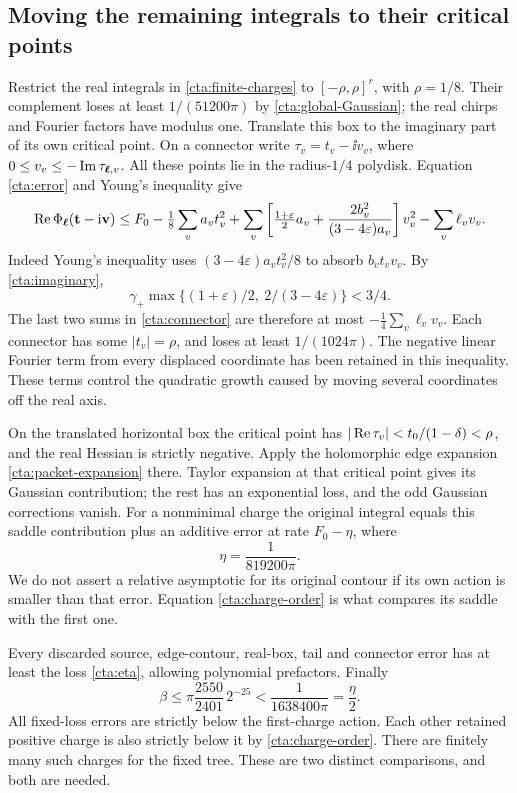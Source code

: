 \subsection{Moving the remaining integrals to their critical points}
Restrict the real integrals in \eqref{cta:finite-charges} to
\([-\rho,\rho]^r\), with \(\rho=1/8\).
Their complement loses at least \(1/(51200\pi)\) by
\eqref{cta:global-Gaussian}; the real chirps and Fourier
factors have modulus one.
Translate this box to the imaginary part of its own critical
point. On a connector write \(\tau_v=t_v-\ii v_v\), where
\(0\le v_v\le-\operatorname{Im}\tau_{\boldsymbol\ell,v}\).
All these points lie in the radius-\(1/4\) polydisk.
Equation \eqref{cta:error} and Young's inequality give
\begin{equation}\label{cta:connector}
 \begin{split}
 \operatorname{Re}\Phi_{\boldsymbol\ell}(\mathbf t-\mathrm i\mathbf v)
 \le F_0-\tfrac18\sum_va_vt_v^2
 +\sum_v\left[
  \tfrac{1+\varepsilon}{2}a_v+
       \frac{2b_v^2}{(3-4\varepsilon)a_v}\right]v_v^2
 -\sum_v\ell_vv_v .
 \end{split}
\end{equation}
Indeed Young's inequality uses
\((3-4\varepsilon)a_vt_v^2/8\) to absorb \(b_vt_vv_v\).
By \eqref{cta:imaginary},
\[
 \gamma_+\max\{(1+\varepsilon)/2,\ 2/(3-4\varepsilon)\}<3/4.
\]
The last two sums in \eqref{cta:connector} are therefore at
most \(-\tfrac14\sum_v\ell_vv_v\). Each connector has some
\(|t_v|=\rho\), and loses at least \(1/(1024\pi)\).
The negative linear Fourier term from every displaced coordinate
has been retained in this inequality. These terms control the
quadratic growth caused by moving several coordinates off the real
axis.

On the translated horizontal box the critical point has
\(|\operatorname{Re}\tau_v|<t_0/(1-\delta)<\rho\), and the real Hessian
is strictly negative. Apply the holomorphic edge expansion
\eqref{cta:packet-expansion} there. Taylor expansion at that
critical point gives its Gaussian contribution; the rest has
an exponential loss, and the odd Gaussian corrections vanish.
For a nonminimal charge the original integral equals this
saddle contribution plus an additive error at rate
\(F_0-\eta\), where
\begin{equation}\label{cta:eta}
 \eta=\frac1{819200\pi}.
\end{equation}
We do not assert a relative asymptotic for its original
contour if its own action is smaller than that error.
Equation \eqref{cta:charge-order} is what compares its saddle
with the first one.

Every discarded source, edge-contour, real-box, tail and
connector error has at least the loss \eqref{cta:eta}, allowing
polynomial prefactors. Finally
\begin{equation}\label{cta:budget}
 \beta\le\pi\frac{2550}{2401}\,2^{-25}
                      <\frac1{1638400\pi}=\frac\eta2.
\end{equation}
All fixed-loss errors are strictly below the first-charge
action. Each other retained positive charge is also strictly
below it by \eqref{cta:charge-order}. There are finitely many
such charges for the fixed tree. These are two distinct
comparisons, and both are needed.
